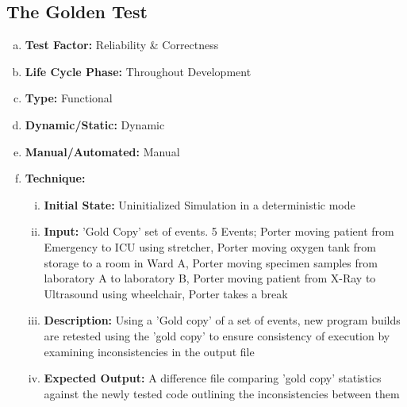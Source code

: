 \documentclass[paper=letter, fontsize=10pt]{scrartcl}
\numberwithin{equation}{section}		%
\numberwithin{figure}{section}			%
\numberwithin{table}{section}				%
\begin{document}
\subsection{The Golden Test}
\begin{enumerate}[(a)]
	\item \textbf{Test Factor:} Reliability \& Correctness 
	\item \textbf{Life Cycle Phase:} Throughout Development
	\item \textbf{Type:} Functional
	\item \textbf{Dynamic/Static:} Dynamic
	\item \textbf{Manual/Automated:} Manual
	\item \textbf{Technique:}
		\begin{enumerate}[(i)]
			\item \textbf{Initial State:} Uninitialized Simulation in a deterministic mode
			\item \textbf{Input:} 'Gold Copy' set of events. 5 Events; Porter moving patient from Emergency to ICU using stretcher, Porter moving oxygen tank from storage to a room in Ward A, Porter moving specimen samples from laboratory A to laboratory B, Porter moving patient from X-Ray to Ultrasound using wheelchair, Porter takes a break 
			\item \textbf{Description:} Using a 'Gold copy' of a set of events, new program builds are retested using the 'gold copy' to ensure consistency of execution by examining inconsistencies in the output file
			\item \textbf{Expected Output:} A difference file comparing 'gold copy' statistics against the newly tested code outlining the inconsistencies between them 
		\end{enumerate}
\end{enumerate}
\end{document}
